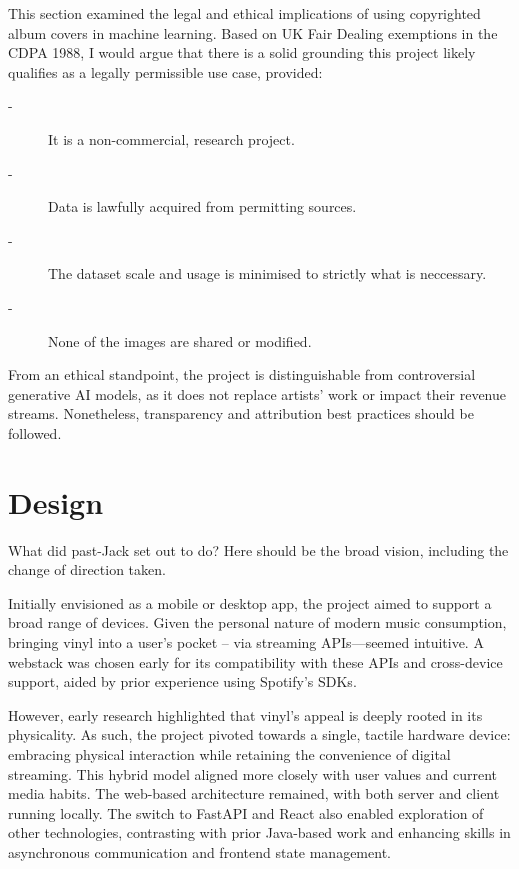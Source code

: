                   This section examined the legal and ethical implications of using copyrighted album covers in machine learning. Based on UK Fair Dealing exemptions in the CDPA 1988, I would argue that there is a solid grounding this project likely qualifies as a legally permissible use case, provided:
                  \begin{description}
                      \item[-] It is a non-commercial, research project.
                      \item[-] Data is lawfully acquired from permitting sources.
                      \item[-] The dataset scale and usage is minimised to strictly what is neccessary.
                      \item[-] None of the images are shared or modified. %
                  \end{description}
                  
                  From an ethical standpoint, the project is distinguishable from controversial generative AI models, as it does not replace artists’ work or impact their revenue streams. Nonetheless, transparency and attribution best practices should be followed.
    
    \section{Design} %
        \begin{temp}
            What did past-Jack set out to do? Here should be the broad vision, including the change of direction taken.
        \end{temp}
    
        Initially envisioned as a mobile or desktop app, the project aimed to support a broad range of devices. Given the personal nature of modern music consumption, bringing vinyl into a user’s pocket -- via streaming APIs—seemed intuitive. A webstack was chosen early for its compatibility with these APIs and cross-device support, aided by prior experience using Spotify’s SDKs.
    
        However, early research highlighted that vinyl’s appeal is deeply rooted in its physicality. As such, the project pivoted towards a single, tactile hardware device: embracing physical interaction while retaining the convenience of digital streaming. This hybrid model aligned more closely with user values and current media habits. The web-based architecture remained, with both server and client running locally. The switch to FastAPI and React also enabled exploration of other technologies, contrasting with prior Java-based work and enhancing skills in asynchronous communication and frontend state management.
    
